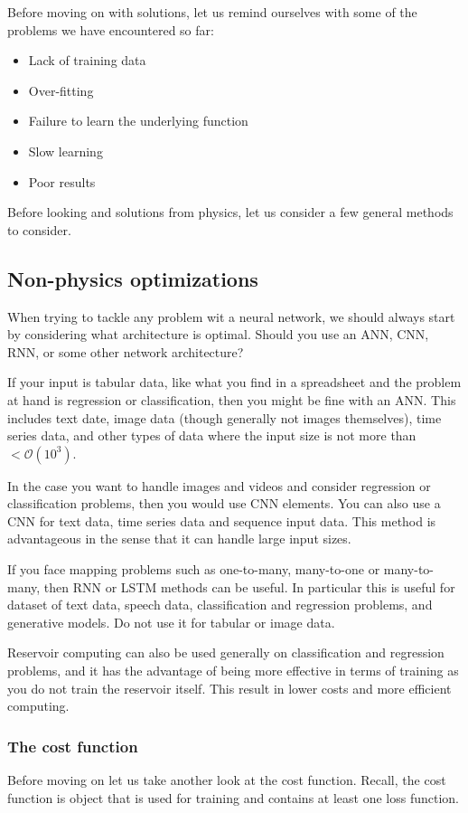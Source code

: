 \documentclass[12pt,a4paper]{article} %
\numberwithin{equation}{section}
\begin{document}
	Before moving on with solutions, let us remind ourselves with some of the problems we have encountered so far:
	\begin{itemize}
		\item Lack of training data
		\item Over-fitting
		\item Failure to learn the underlying function
		\item Slow learning
		\item Poor results
	\end{itemize}
	Before looking and solutions from physics, let us consider a few general methods to consider.
	
	\subsection{Non-physics optimizations}
		When trying to tackle any problem wit a neural network, we should always start by considering what architecture is optimal. Should you use an ANN, CNN, RNN, or some other network architecture?
		
		If your input is tabular data, like what you find in a spreadsheet and the problem at hand is regression or classification, then you might be fine with an ANN. This includes text date, image data (though generally not images themselves), time series data, and other types of data where the input size is not more than $<\mathcal{O}(10^3)$.  
		
		In the case you want to handle images and videos and consider regression or classification problems, then you would use CNN elements. You can also use a CNN for text data, time series data and sequence input data. This method is advantageous in the sense that it can handle large input sizes. 
		
		If you face mapping problems such as one-to-many, many-to-one or many-to-many, then RNN or LSTM methods can be useful. In particular this is useful for dataset of text data, speech data, classification and regression problems, and generative models. Do not use it for tabular or image data.
		
		Reservoir computing can also be used generally on classification and regression problems, and it has the advantage of being more effective in terms of training as you do not train the reservoir itself. This result in lower costs and more efficient computing.
		
		\subsubsection{The cost function}
			Before moving on let us take another look at the cost function. Recall, the cost function is object that is used for training and contains at least one loss function. 
			
\end{document}
